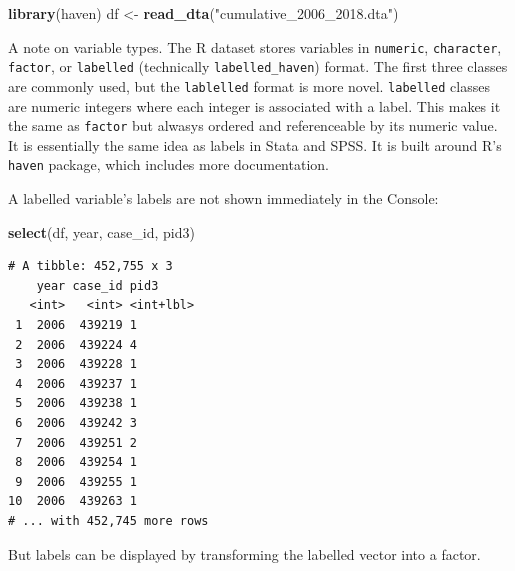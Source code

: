 \documentclass[10pt,article,oneside]{memoir}
\theoremstyle{definition}
\newenvironment{Shaded}{\begin{snugshade}}{\end{snugshade}}
\newcommand{\DataTypeTok}[1]{\textcolor[rgb]{0.13,0.29,0.53}{#1}}
\newcommand{\KeywordTok}[1]{\textcolor[rgb]{0.13,0.29,0.53}{\textbf{#1}}}
\newcommand{\NormalTok}[1]{#1}
\newcommand{\OperatorTok}[1]{\textcolor[rgb]{0.81,0.36,0.00}{\textbf{#1}}}
\newcommand{\StringTok}[1]{\textcolor[rgb]{0.31,0.60,0.02}{#1}}
\begin{document}
\begin{Shaded}
\begin{Highlighting}[]
\KeywordTok{library}\NormalTok{(haven)}
\NormalTok{df <-}\StringTok{ }\KeywordTok{read_dta}\NormalTok{(}\StringTok{"cumulative_2006_2018.dta"}\NormalTok{)}
\end{Highlighting}
\end{Shaded}

A note on variable types. The R dataset stores variables in
\texttt{numeric}, \texttt{character}, \texttt{factor}, or
\texttt{labelled} (technically \texttt{labelled\_haven}) format. The
first three classes are commonly used, but the \texttt{lablelled} format
is more novel. \texttt{labelled} classes are numeric integers where each
integer is associated with a label. This makes it the same as
\texttt{factor} but alwasys ordered and referenceable by its numeric
value. It is essentially the same idea as labels in Stata and SPSS. It
is built around R's \texttt{haven} package, which includes more
documentation.

A labelled variable's labels are not shown immediately in the Console:

\begin{Shaded}
\begin{Highlighting}[]
\KeywordTok{select}\NormalTok{(df, year, case_id, pid3)}
\end{Highlighting}
\end{Shaded}

\begin{verbatim}
# A tibble: 452,755 x 3
    year case_id pid3     
   <int>   <int> <int+lbl>
 1  2006  439219 1        
 2  2006  439224 4        
 3  2006  439228 1        
 4  2006  439237 1        
 5  2006  439238 1        
 6  2006  439242 3        
 7  2006  439251 2        
 8  2006  439254 1        
 9  2006  439255 1        
10  2006  439263 1        
# ... with 452,745 more rows
\end{verbatim}

But labels can be displayed by transforming the labelled vector into a
factor.

\begin{Shaded}
\end{Shaded}
\end{document}
